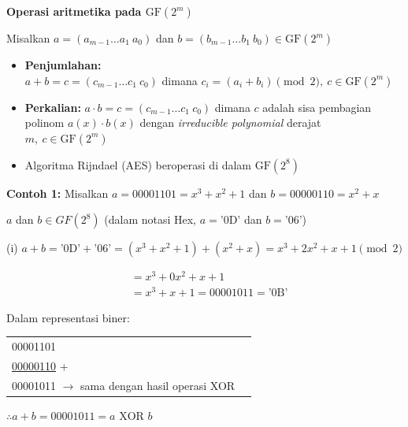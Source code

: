 \documentclass{article}
\begin{document}
\newpage


\textbf{Operasi aritmetika pada $\text{GF}(2^m)$}

Misalkan $a = (a_{m-1} \dots a_1 \ a_0)$ dan $b = (b_{m-1} \dots b_1 \ b_0) \in \text{GF}(2^m)$

\begin{itemize}
    \item \textbf{Penjumlahan:} \\
    $a + b = c = (c_{m-1} \dots c_1 \ c_0)$ dimana $c_i = (a_i + b_i) \pmod 2, \ c \in \text{GF}(2^m)$
    
    \item \textbf{Perkalian:} $a \cdot b = c = (c_{m-1} \dots c_1 \ c_0)$ dimana $c$ adalah sisa pembagian polinom $a(x) \cdot b(x)$ dengan \textit{irreducible polynomial} derajat $m, \ c \in \text{GF}(2^m)$
    
    \item Algoritma Rijndael (AES) beroperasi di dalam $\text{GF}(2^8)$
\end{itemize}

\newpage


\textbf{Contoh 1:} Misalkan $a = 00001101 = x^3 + x^2 + 1$ dan $b = 00000110 = x^2 + x$

$a$ dan $b \in GF(2^8)$ \quad (dalam notasi Hex, $a = \text{'0D'}$ dan $b = \text{'06'}$)

(i) $a + b = \text{'0D'} + \text{'06'} = (x^3 + x^2 + 1) + (x^2 + x) = x^3 + 2x^2 + x + 1 \pmod{2}$

\vspace{5mm}

\begin{align*}
&= x^3 + 0x^2 + x + 1 \\
&= x^3 + x + 1 = 00001011 = \text{'0B'}
\end{align*}

Dalam representasi biner:

\begin{tabular}{ll}
00001101 \\
\underline{00000110} + \\
00001011 $\rightarrow$ sama dengan hasil operasi XOR
\end{tabular}

\vspace{5mm}

$\therefore a + b = 00001011 = a \text{ XOR } b$
\end{document}
